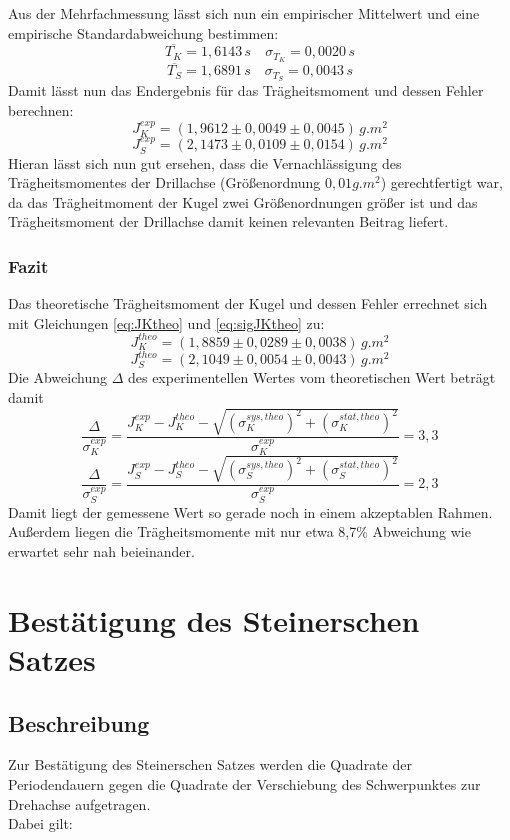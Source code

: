 \documentclass[12pt,a4paper]{article}
\begin{document}
Aus der Mehrfachmessung lässt sich nun ein empirischer Mittelwert und eine empirische Standardabweichung bestimmen:
\[\overline{T_K} = 1,6143 \,s \quad \sigma_{T_K} = 0,0020 \, s \]
\[\overline{T_S} = 1,6891 \, s \quad \sigma_{T_S} = 0,0043 \, s \]
Damit lässt nun das Endergebnis für das Trägheitsmoment und dessen Fehler berechnen:
\[J_K^{exp} = (1,9612 \pm 0,0049 \pm 0,0045) \, \si{g.m ^2} \]
\[J_S^{exp} = (2,1473 \pm 0,0109 \pm 0,0154) \, \si{g.m ^2} \]
Hieran lässt sich nun gut ersehen, dass die Vernachlässigung des Trägheitsmomentes der Drillachse (Größenordnung $0,01\si{g.m ^2}$) gerechtfertigt war, da das Trägheitmoment der Kugel zwei Größenordnungen größer ist und das Trägheitsmoment der Drillachse damit keinen relevanten Beitrag liefert.

\subsubsection{Fazit}
Das theoretische Trägheitsmoment der Kugel und dessen Fehler errechnet sich mit Gleichungen \ref{eq:JKtheo} und \ref{eq:sigJKtheo} zu:
\[J_K^{theo} = (1,8859 \pm 0,0289 \pm 0,0038) \, \si{g.m ^2} \]
\[J_S^{theo} = (2,1049 \pm 0,0054 \pm 0,0043) \, \si{g.m ^2} \]
Die Abweichung $\Delta$ des experimentellen Wertes vom theoretischen Wert beträgt damit 
\[\dfrac{\Delta}{\sigma _K^{exp}} = \dfrac{J_K^{exp} - J_K^{theo} - \sqrt{\left( \sigma _K^{sys,theo}\right) ^2 + \left( \sigma _K^{stat,theo}\right) ^2}}{\sigma _K^{exp}} = 3,3 \]
\[\dfrac{\Delta}{\sigma _S^{exp}} = \dfrac{J_S^{exp} - J_S^{theo} - \sqrt{\left( \sigma _S^{sys,theo}\right) ^2 + \left( \sigma _S^{stat,theo}\right) ^2}}{\sigma _S^{exp}} = 2,3 \]
Damit liegt der gemessene Wert so gerade noch in einem akzeptablen Rahmen. \\
Außerdem liegen die Trägheitsmomente mit nur etwa 8,7\% Abweichung wie erwartet sehr nah beieinander.




\section{Bestätigung des Steinerschen Satzes}
\subsection{Beschreibung}
Zur Bestätigung des Steinerschen Satzes werden die Quadrate der Periodendauern gegen die Quadrate der Verschiebung des Schwerpunktes zur 
Drehachse aufgetragen.\\
Dabei gilt:
\end{document}
